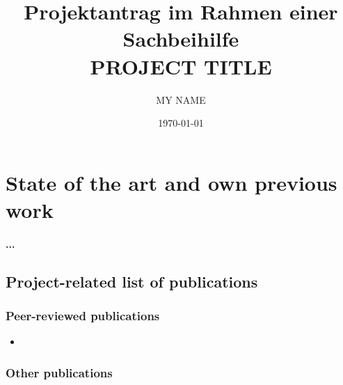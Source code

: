 \documentclass[a4paper,11pt]{article}
\begin{document}
\title{{\small Projektantrag im Rahmen einer Sachbeihilfe}\\{\bf \LARGE PROJECT TITLE}}
\author{MY NAME}
\date{\today}
\maketitle


\section{State of the art and own previous work}
%
\paragraph{...}

\subsection{Project-related list of publications}

\subsubsection{Peer-reviewed publications}



\begin{itemize}
  \item {}
\end{itemize}

\subsubsection{Other publications}
\end{document}
